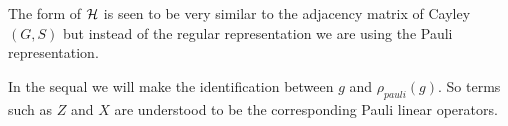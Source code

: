\documentclass[12pt,notitlepage,longbibliography,nofootinbib,tightenlines]{revtex4}
\begin{document}
The form of $\mathcal{H}$ is seen to be very similar
to the adjacency matrix of Cayley$(G, S)$ but
instead of the regular representation we are
using the Pauli representation.

%
%
%
%



%
%
%

In the sequal we will make the identification
between $g$ and $\rho_{pauli}(g)$.
So terms such as $Z$ and $X$ are understood
to be the corresponding Pauli linear operators.

%
%
\end{document}
